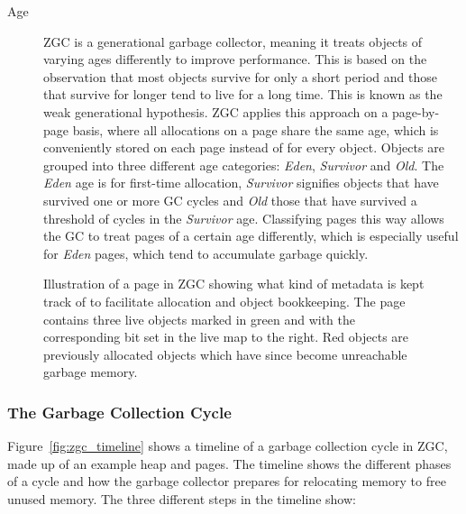 \begin{description}
    \item[Age]
        ZGC is a generational garbage collector, meaning it treats objects of varying ages differently to improve performance. This is based on the observation that most objects survive for only a short period and those that survive for longer tend to live for a long time. This is known as the weak generational hypothesis. ZGC applies this approach on a page-by-page basis, where all allocations on a page share the same age, which is conveniently stored on each page instead of for every object. Objects are grouped into three different age categories: \textit{Eden}, \textit{Survivor} and \textit{Old}. The \textit{Eden} age is for first-time allocation, \textit{Survivor} signifies objects that have survived one or more GC cycles and \textit{Old} those that have survived a threshold of cycles in the \textit{Survivor} age. Classifying pages this way allows the GC to treat pages of a certain age differently, which is especially useful for \textit{Eden} pages, which tend to accumulate garbage quickly.
\end{description}

\begin{figure}[H]
    \centering
    
    \caption{Illustration of a page in ZGC showing what kind of metadata is kept track of to facilitate allocation and object bookkeeping. The page contains three live objects marked in green and with the corresponding bit set in the live map to the right. Red objects are previously allocated objects which have since become unreachable garbage memory.}
    \label{fig:zpages}
\end{figure}

\subsubsection{The Garbage Collection Cycle}

Figure~\ref{fig:zgc_timeline} shows a timeline of a garbage collection cycle in ZGC, made up of an example heap and pages. The timeline shows the different phases of a cycle and how the garbage collector prepares for relocating memory to free unused memory. The three different steps in the timeline show:

\vspace*{-0.4cm}

